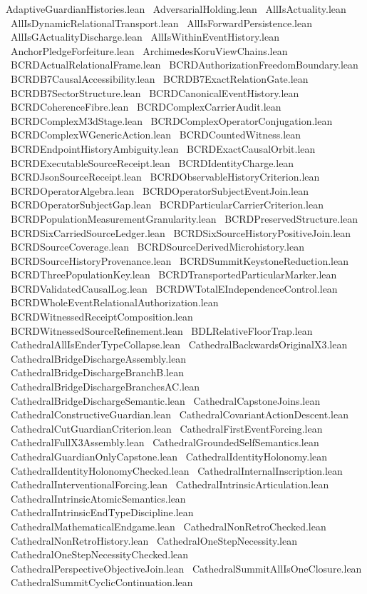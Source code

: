 AdaptiveGuardianHistories.lean \
AdversarialHolding.lean \
AllIsActuality.lean \
AllIsDynamicRelationalTransport.lean \
AllIsForwardPersistence.lean \
AllIsGActualityDischarge.lean \
AllIsWithinEventHistory.lean \
AnchorPledgeForfeiture.lean \
ArchimedesKoruViewChains.lean \
BCRDActualRelationalFrame.lean \
BCRDAuthorizationFreedomBoundary.lean \
BCRDB7CausalAccessibility.lean \
BCRDB7ExactRelationGate.lean \
BCRDB7SectorStructure.lean \
BCRDCanonicalEventHistory.lean \
BCRDCoherenceFibre.lean \
BCRDComplexCarrierAudit.lean \
BCRDComplexM3dStage.lean \
BCRDComplexOperatorConjugation.lean \
BCRDComplexWGenericAction.lean \
BCRDCountedWitness.lean \
BCRDEndpointHistoryAmbiguity.lean \
BCRDExactCausalOrbit.lean \
BCRDExecutableSourceReceipt.lean \
BCRDIdentityCharge.lean \
BCRDJsonSourceReceipt.lean \
BCRDObservableHistoryCriterion.lean \
BCRDOperatorAlgebra.lean \
BCRDOperatorSubjectEventJoin.lean \
BCRDOperatorSubjectGap.lean \
BCRDParticularCarrierCriterion.lean \
BCRDPopulationMeasurementGranularity.lean \
BCRDPreservedStructure.lean \
BCRDSixCarriedSourceLedger.lean \
BCRDSixSourceHistoryPositiveJoin.lean \
BCRDSourceCoverage.lean \
BCRDSourceDerivedMicrohistory.lean \
BCRDSourceHistoryProvenance.lean \
BCRDSummitKeystoneReduction.lean \
BCRDThreePopulationKey.lean \
BCRDTransportedParticularMarker.lean \
BCRDValidatedCausalLog.lean \
BCRDWTotalEIndependenceControl.lean \
BCRDWholeEventRelationalAuthorization.lean \
BCRDWitnessedReceiptComposition.lean \
BCRDWitnessedSourceRefinement.lean \
BDLRelativeFloorTrap.lean \
CathedralAllIsEnderTypeCollapse.lean \
CathedralBackwardsOriginalX3.lean \
CathedralBridgeDischargeAssembly.lean \
CathedralBridgeDischargeBranchB.lean \
CathedralBridgeDischargeBranchesAC.lean \
CathedralBridgeDischargeSemantic.lean \
CathedralCapstoneJoins.lean \
CathedralConstructiveGuardian.lean \
CathedralCovariantActionDescent.lean \
CathedralCutGuardianCriterion.lean \
CathedralFirstEventForcing.lean \
CathedralFullX3Assembly.lean \
CathedralGroundedSelfSemantics.lean \
CathedralGuardianOnlyCapstone.lean \
CathedralIdentityHolonomy.lean \
CathedralIdentityHolonomyChecked.lean \
CathedralInternalInscription.lean \
CathedralInterventionalForcing.lean \
CathedralIntrinsicArticulation.lean \
CathedralIntrinsicAtomicSemantics.lean \
CathedralIntrinsicEndTypeDiscipline.lean \
CathedralMathematicalEndgame.lean \
CathedralNonRetroChecked.lean \
CathedralNonRetroHistory.lean \
CathedralOneStepNecessity.lean \
CathedralOneStepNecessityChecked.lean \
CathedralPerspectiveObjectiveJoin.lean \
CathedralSummitAllIsOneClosure.lean \
CathedralSummitCyclicContinuation.lean \
